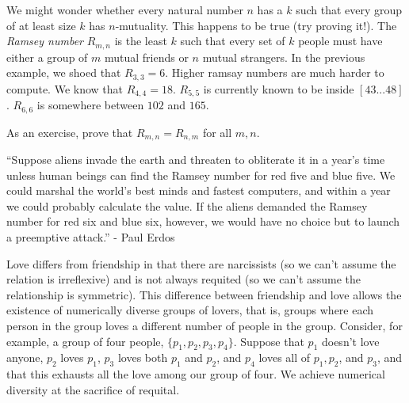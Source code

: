 \begin{aside}
We might wonder whether every natural number $n$ has a $k$ such that every group of at least size $k$ has $n$-mutuality. This happens to be true (try proving it!). The \emph{Ramsey number} $R_{m, n}$ is the least $k$ such that every set of $k$ people must have either a group of $m$ mutual friends or $n$ mutual strangers. In the previous example, we shoed that $R_{3, 3} = 6$. Higher ramsay numbers are much harder to compute. We know that $R_{4, 4} = 18$. $R_{5, 5}$ is currently known to be inside $[43...48]$. $R_{6, 6}$ is somewhere between $102$ and $165$. 

As an exercise, prove that $R_{m, n} = R_{n, m}$ for all $m, n$.

``Suppose aliens invade the earth and threaten to obliterate it in a year's time unless human beings can find the Ramsey number for red five and blue five. We could marshal the world's best minds and fastest computers, and within a year we could probably calculate the value. If the aliens demanded the Ramsey number for red six and blue six, however, we would have no choice but to launch a preemptive attack.'' - Paul Erdos
\end{aside}

Love differs from friendship in that there are narcissists (so we can't assume the relation is irreflexive) and is not always requited (so we can't assume the relationship is symmetric). This difference between friendship and love allows the existence of numerically diverse groups of lovers, that is, groups where each person in the group loves a different number of people in the group. Consider, for example, a group of four people, $\{p_1, p_2, p_3, p_4\}$. Suppose that $p_1$ doesn't love anyone, $p_2$ loves $p_1$, $p_3$ loves both $p_1$ and $p_2$, and $p_4$ loves all of $p_1,p_2$, and $p_3$, and that this exhausts all the love among our group of four. We achieve numerical diversity at the sacrifice of requital. 

\begin{center}
\end{center}

